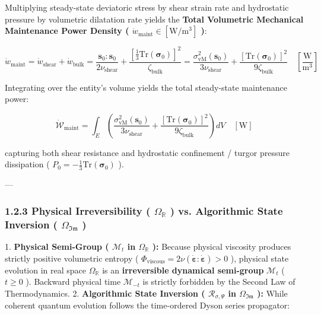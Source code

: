 \documentclass[11pt,a4paper]{article}
\theoremstyle{definition}
\theoremstyle{remark}
\begin{document}
Multiplying steady-state deviatoric stress by shear strain rate and hydrostatic pressure by volumetric dilatation rate yields the \textbf{Total Volumetric Mechanical Maintenance Power Density ( $\dot{w}_{\text{maint}} \in [\mathrm{W/m^3}]$ )}:


\begin{equation}
\boxed{\dot{w}_{\text{maint}} = \dot{w}_{\text{shear}} + \dot{w}_{\text{bulk}} = \frac{\mathbf{s}_0 : \mathbf{s}_0}{2\nu_{\text{shear}}} + \frac{[\frac{1}{3}\mathrm{Tr}(\boldsymbol{\sigma}_0)]^2}{\zeta_{\text{bulk}}} = \frac{\sigma_{\mathrm{vM}}^2\left(\mathbf{s}_0\right)}{3 \nu_{\text{shear}}} + \frac{[ \mathrm{Tr} \left(\boldsymbol{\sigma}_0\right) ]^2}{9 \zeta_{\text{bulk}}} \quad [\frac{\mathrm{W}}{\mathrm{m^3}}]}
\end{equation}


Integrating over the entity's volume yields the total steady-state maintenance power:


\begin{equation}
\boxed{\dot{\mathcal{W}}_{\text{maint}} = \int_E \left( \frac{\sigma_{\mathrm{vM}}^2(\mathbf{s}_0)}{3\nu_{\text{shear}}} + \frac{[ \mathrm{Tr}(\boldsymbol{\sigma}_0) ]^2}{9\zeta_{\text{bulk}}} \right) dV \quad [\mathrm{W}]}
\end{equation}


capturing both shear resistance and hydrostatic confinement / turgor pressure dissipation ( $P_0 = -\frac{1}{3}\mathrm{Tr}(\boldsymbol{\sigma}_0)$ ).

---

\subsubsection{1.2.3 Physical Irreversibility ( $\Omega_{\mathbb{R}}$ ) vs. Algorithmic State Inversion ( $\Omega_{\mathfrak{Im}}$ )}
1. \textbf{Physical Semi-Group ( $\mathcal{M}_t$ in $\Omega_{\mathbb{R}}$ ):}
Because physical viscosity produces strictly positive volumetric entropy ( $\Phi_{\text{viscous}} = 2\nu (\dot{\boldsymbol{\varepsilon}}:\dot{\boldsymbol{\varepsilon}}) > 0$ ), physical state evolution in real space $\Omega_{\mathbb{R}}$ is an \textbf{irreversible dynamical semi-group} $\mathcal{M}_t$ ( $t \ge 0$ ). Backward physical time $\mathcal{M}_{-t}$ is strictly forbidden by the Second Law of Thermodynamics.
2. \textbf{Algorithmic State Inversion ( $\mathcal{R}_{\sigma, \Psi}$ in $\Omega_{\mathfrak{Im}}$ ):}
While coherent quantum evolution follows the time-ordered Dyson series propagator:
\end{document}
